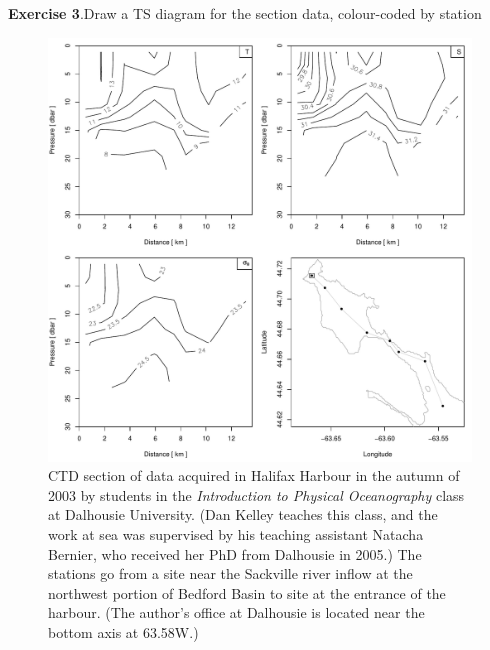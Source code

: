 \documentclass{article}
\newcommand{\workedexercise}[2]{
	\vspace{2ex plus 2ex minus 1ex}
	\begin{boxedminipage}[c]{0.95\linewidth}
		{\textbf{Exercise #1}.\hspace{1em}#2}
	\end{boxedminipage}
	\vspace{2ex plus 2ex minus 1ex}
}
\begin{document}
\workedexercise{3}{Draw a TS diagram for the section data, colour-coded by station}

\begin{figure}
\begin{center}
\includegraphics{oce-sectionfig}
\end{center}
\caption{\label{fig:section}
CTD section of data acquired in Halifax Harbour in the autumn of 2003 by
students in the \emph{Introduction to Physical Oceanography} class at Dalhousie
University.  (Dan Kelley teaches this class, and the work at sea was supervised
by his teaching assistant Natacha Bernier, who received her PhD from Dalhousie
in 2005.)  The stations go from a site near the Sackville river inflow at the
northwest portion of Bedford Basin to site at the entrance of the harbour. (The
author's office at Dalhousie is located near the bottom axis at 63.58W.)}
\end{figure}


\end{document}
